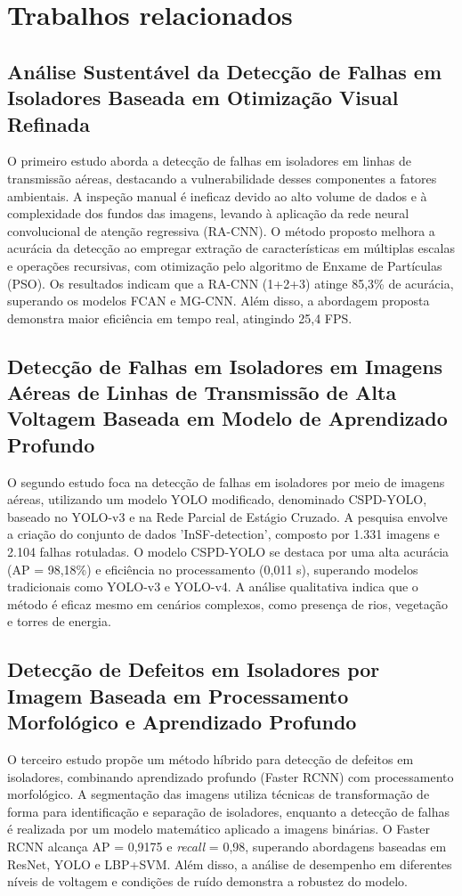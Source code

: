 \chapter{Trabalhos relacionados}


\section{Análise Sustentável da Detecção de Falhas em Isoladores Baseada em Otimização Visual Refinada}
O primeiro estudo aborda a detecção de falhas em isoladores em linhas de transmissão aéreas, destacando a vulnerabilidade desses componentes a fatores ambientais. A inspeção manual é ineficaz devido ao alto volume de dados e à complexidade dos fundos das imagens, levando à aplicação da rede neural convolucional de atenção regressiva (RA-CNN). O método proposto melhora a acurácia da detecção ao empregar extração de características em múltiplas escalas e operações recursivas, com otimização pelo algoritmo de Enxame de Partículas (PSO). Os resultados indicam que a RA-CNN (1+2+3) atinge 85,3\% de acurácia, superando os modelos FCAN e MG-CNN. Além disso, a abordagem proposta demonstra maior eficiência em tempo real, atingindo 25,4 FPS. \cite{wang2023}

\section{Detecção de Falhas em Isoladores em Imagens Aéreas de Linhas de Transmissão de Alta Voltagem Baseada em Modelo de Aprendizado Profundo}
O segundo estudo foca na detecção de falhas em isoladores por meio de imagens aéreas, utilizando um modelo YOLO modificado, denominado CSPD-YOLO, baseado no YOLO-v3 e na Rede Parcial de Estágio Cruzado. A pesquisa envolve a criação do conjunto de dados 'InSF-detection', composto por 1.331 imagens e 2.104 falhas rotuladas. O modelo CSPD-YOLO se destaca por uma alta acurácia (AP = 98,18\%) e eficiência no processamento (0,011 s), superando modelos tradicionais como YOLO-v3 e YOLO-v4. A análise qualitativa indica que o método é eficaz mesmo em cenários complexos, como presença de rios, vegetação e torres de energia. \cite{liu2021}

\section{Detecção de Defeitos em Isoladores por Imagem Baseada em Processamento Morfológico e Aprendizado Profundo}
O terceiro estudo propõe um método híbrido para detecção de defeitos em isoladores, combinando aprendizado profundo (Faster RCNN) com processamento morfológico. A segmentação das imagens utiliza técnicas de transformação de forma para identificação e separação de isoladores, enquanto a detecção de falhas é realizada por um modelo matemático aplicado a imagens binárias. O Faster RCNN alcança AP = 0,9175 e \textit{recall} = 0,98, superando abordagens baseadas em ResNet, YOLO e LBP+SVM. Além disso, a análise de desempenho em diferentes níveis de voltagem e condições de ruído demonstra a robustez do modelo. \cite{zhang2022}

